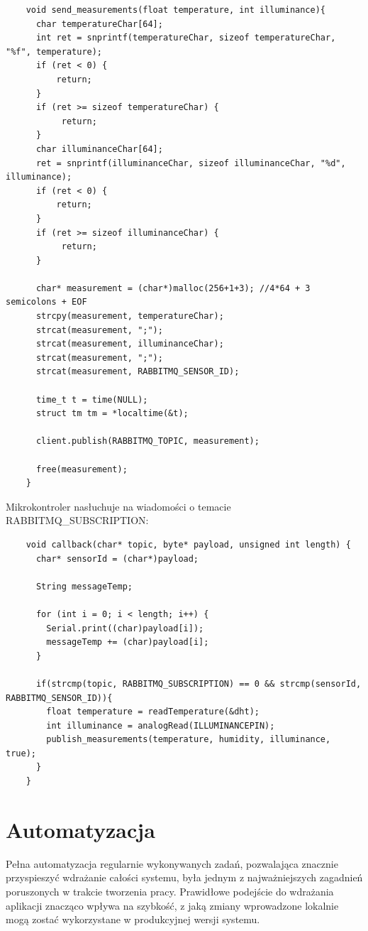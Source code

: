 \documentclass[11pt, a4]{article} %
\begin{document}
\begin{lstlisting}
    void send_measurements(float temperature, int illuminance){
      char temperatureChar[64];
      int ret = snprintf(temperatureChar, sizeof temperatureChar, "%f", temperature);
      if (ret < 0) {
          return;
      }
      if (ret >= sizeof temperatureChar) {
           return;
      }
      char illuminanceChar[64];
      ret = snprintf(illuminanceChar, sizeof illuminanceChar, "%d", illuminance);
      if (ret < 0) {
          return;
      }
      if (ret >= sizeof illuminanceChar) {
           return;
      }
    
      char* measurement = (char*)malloc(256+1+3); //4*64 + 3 semicolons + EOF
      strcpy(measurement, temperatureChar);
      strcat(measurement, ";");
      strcat(measurement, illuminanceChar);
      strcat(measurement, ";");
      strcat(measurement, RABBITMQ_SENSOR_ID);
    
      time_t t = time(NULL);
      struct tm tm = *localtime(&t);
    
      client.publish(RABBITMQ_TOPIC, measurement);
    
      free(measurement);
    }
\end{lstlisting}

Mikrokontroler nasłuchuje na wiadomości o temacie RABBITMQ\_SUBSCRIPTION:

\begin{lstlisting}
    void callback(char* topic, byte* payload, unsigned int length) {
      char* sensorId = (char*)payload;
    
      String messageTemp;
      
      for (int i = 0; i < length; i++) {
        Serial.print((char)payload[i]);
        messageTemp += (char)payload[i];
      }
    
      if(strcmp(topic, RABBITMQ_SUBSCRIPTION) == 0 && strcmp(sensorId, RABBITMQ_SENSOR_ID)){
        float temperature = readTemperature(&dht);
        int illuminance = analogRead(ILLUMINANCEPIN);
        publish_measurements(temperature, humidity, illuminance, true);
      }
    }
\end{lstlisting}

\section{Automatyzacja}

Pełna automatyzacja regularnie wykonywanych zadań, pozwalająca znacznie przyspieszyć 
wdrażanie całości systemu, była jednym z najważniejszych zagadnień poruszonych w 
trakcie tworzenia pracy. Prawidłowe podejście do wdrażania aplikacji znacząco wpływa 
na szybkość, z jaką zmiany wprowadzone lokalnie mogą zostać wykorzystane w 
produkcyjnej wersji systemu. 
\end{document}
